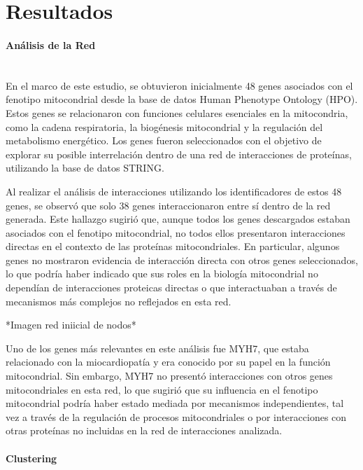 
\section{Resultados}


\paragraph{Análisis de la Red} \mbox{}\\

En el marco de este estudio, se obtuvieron inicialmente 48 genes asociados con el fenotipo mitocondrial desde la base de datos Human Phenotype Ontology (HPO). Estos genes se relacionaron con funciones celulares esenciales en la mitocondria, como la cadena respiratoria, la biogénesis mitocondrial y la regulación del metabolismo energético. Los genes fueron seleccionados con el objetivo de explorar su posible interrelación dentro de una red de interacciones de proteínas, utilizando la base de datos STRING.

Al realizar el análisis de interacciones utilizando los identificadores de estos 48 genes, se observó que solo 38 genes interaccionaron entre sí dentro de la red generada. Este hallazgo sugirió que, aunque todos los genes descargados estaban asociados con el fenotipo mitocondrial, no todos ellos presentaron interacciones directas en el contexto de las proteínas mitocondriales. En particular, algunos genes no mostraron evidencia de interacción directa con otros genes seleccionados, lo que podría haber indicado que sus roles en la biología mitocondrial no dependían de interacciones proteicas directas o que interactuaban a través de mecanismos más complejos no reflejados en esta red.

*Imagen red iniicial de nodos*

Uno de los genes más relevantes en este análisis fue MYH7, que estaba relacionado con la miocardiopatía y era conocido por su papel en la función mitocondrial. Sin embargo, MYH7 no presentó interacciones con otros genes mitocondriales en esta red, lo que sugirió que su influencia en el fenotipo mitocondrial podría haber estado mediada por mecanismos independientes, tal vez a través de la regulación de procesos mitocondriales o por interacciones con otras proteínas no incluidas en la red de interacciones analizada.

\paragraph{Clustering} \mbox{}\\

